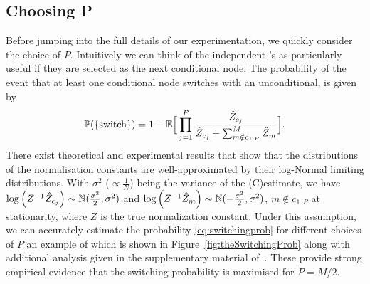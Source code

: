 

\subsection{Choosing P}
\label{sec:part:ipmcmc:choosingP}
Before jumping into the full details of our experimentation, we quickly consider the choice of $P$. Intuitively we can think of the independent \smc's as particularly useful if they are selected as the next conditional node. The probability of the event %
that at least one conditional node switches with an unconditional, is given by
\begin{align}
\label{eq:switchingprob}
\mathbb{P}(\{\text{switch}\}) 
= 1 - \mathbb{E}\Big[\prod_{j=1}^P \frac{\hat Z_{c_j}}{\hat Z_{c_j} +\sum_{m \notin c_{1:P}}^M \hat Z_{m}}\Big].
\end{align}
There exist theoretical and experimental results \citep{pitt2012some,berard2014lognormal,doucet2015efficient} that show that the distributions of the normalisation constants are well-approximated by their log-Normal limiting distributions. With $\sigma^2$ ($\propto \frac{1}{N}$) being the variance of the (C)\smc estimate, we have $\log \left(Z^{-1} \hat Z_{c_j} \right) \sim \mathbb{N}(\frac{\sigma^2}{2},\sigma^2)$ and $\log \left(Z^{-1} \hat Z_{m} \right) \sim \mathbb{N}(-\frac{\sigma^2}{2},\sigma^2)$, $m\notin c_{1:P}$ at stationarity, where $Z$ is the true normalization constant. Under this assumption, we can accurately estimate the probability \eqref{eq:switchingprob} for different choices of $P$ an example of which is shown in Figure~\ref{fig:theSwitchingProb} along with additional analysis given in the supplementary material of~\cite{rainforth2016interacting}. These provide strong empirical evidence that the switching probability is maximised for $P=M/2$.

